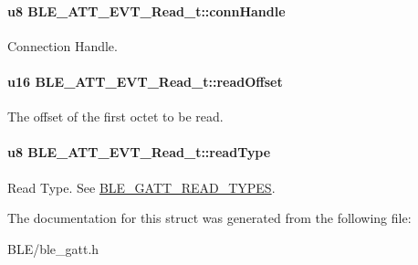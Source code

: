 \paragraph[{\texorpdfstring{conn\+Handle}{connHandle}}]{\setlength{\rightskip}{0pt plus 5cm}u8 B\+L\+E\+\_\+\+A\+T\+T\+\_\+\+E\+V\+T\+\_\+\+Read\+\_\+t\+::conn\+Handle}\hypertarget{struct_b_l_e___a_t_t___e_v_t___read__t_a2a218e82f1e992578b24197543bb06f5}{}\label{struct_b_l_e___a_t_t___e_v_t___read__t_a2a218e82f1e992578b24197543bb06f5}
Connection Handle. 
\paragraph[{\texorpdfstring{read\+Offset}{readOffset}}]{\setlength{\rightskip}{0pt plus 5cm}u16 B\+L\+E\+\_\+\+A\+T\+T\+\_\+\+E\+V\+T\+\_\+\+Read\+\_\+t\+::read\+Offset}\hypertarget{struct_b_l_e___a_t_t___e_v_t___read__t_a59fd444a9c256ed3f3eead9a5222c60a}{}\label{struct_b_l_e___a_t_t___e_v_t___read__t_a59fd444a9c256ed3f3eead9a5222c60a}
The offset of the first octet to be read. 
\paragraph[{\texorpdfstring{read\+Type}{readType}}]{\setlength{\rightskip}{0pt plus 5cm}u8 B\+L\+E\+\_\+\+A\+T\+T\+\_\+\+E\+V\+T\+\_\+\+Read\+\_\+t\+::read\+Type}\hypertarget{struct_b_l_e___a_t_t___e_v_t___read__t_ab618c0035772a3aa76192f9a76690cbc}{}\label{struct_b_l_e___a_t_t___e_v_t___read__t_ab618c0035772a3aa76192f9a76690cbc}
Read Type. See \hyperlink{group___b_l_e___g_a_t_t___r_e_a_d___t_y_p_e_s}{B\+L\+E\+\_\+\+G\+A\+T\+T\+\_\+\+R\+E\+A\+D\+\_\+\+T\+Y\+P\+ES}. 

The documentation for this struct was generated from the following file\+:\begin{DoxyCompactItemize}
\item 
B\+L\+E/ble\+\_\+gatt.\+h\end{DoxyCompactItemize}
